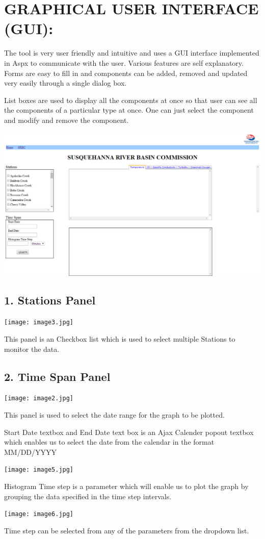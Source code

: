 \documentclass[a4paper]{article}
\begin{document}
\newpage
\section*{GRAPHICAL USER INTERFACE (GUI):}
The tool is very user friendly and intuitive and uses a GUI interface implemented in Aspx to communicate with the user. Various features are self explanatory.
Forms are easy to fill in and components can be added, removed and updated very easily through a single dialog box.\par List boxes are used to display all the components at once so that user can see all the components of a particular type at once. One can just select the component and modify and remove the component.
\begin{center}
\includegraphics[scale=0.50]{srbcfull.jpg}
\end{center}
\bigskip
\bigskip
\subsection*{1. Stations Panel}
\begin{center}
\texttt{[image: image3.jpg]}
\end{center}
{\normalsize This panel is an Checkbox list which is used to select multiple Stations to monitor the data.}
\subsection*{2. Time Span Panel}
\begin{center}
\texttt{[image: image2.jpg]}
\end{center}
{\normalsize This panel is used to select the date range for the graph to be plotted.\par Start Date textbox and End Date text box is an Ajax Calender popout textbox which enables us to select the date from the calendar in the format MM/DD/YYYY}
\begin{center}
\texttt{[image: image5.jpg]}
\end{center}
{\normalsize Histogram Time step is a parameter which will enable us to plot the graph by grouping the data specified in the time step intervals.}
\begin{center}
\texttt{[image: image6.jpg]}
\end{center}
{\normalsize Time step can be selected from any of the parameters from the dropdown list.}
\end{document}
